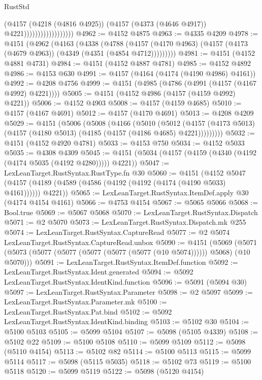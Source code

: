 \begin{lexlean}{RustStd}
\begin{coremodule}
                                    (@4157
                                      (@4218 (@4816 @4925))
                                      (@4157 (@4373 (@4646 @4917)) @4221))))))))))))))))))
@4962 := @4152 @4875
@4963 := @4335 @4209
@4978 := @4151
    (@4962
      (@4163
        (@4338
          (@4788
            (@4157 (@4170 @4963) (@4157 (@4173 (@4679 @4963)) (@4349 (@4351 (@4854 @4712)))))))))
@4981 := @4151 (@4152 @4881 @4731)
@4984 := @4151 (@4152 @4887 @4781)
@4985 := @4152 @4892
@4986 := @4153 @630
@4991 := @4157 (@4164 (@4174 (@4190 @4986) @4161))
@4992 := @4208 @4756
@4999 := @4151 (@4985 (@4786 (@4991 (@4157 (@4167 @4992) @4221))))
@5005 := @4151 (@4152 @4986 (@4157 (@4159 @4992) @4221))
@5006 := @4152 @4903
@5008 := @4157 (@4159 @4685)
@5010 := @4157 (@4167 @4691)
@5012 := @4157 (@4170 @4691)
@5013 := @4208 @4209
@5029 := @4151
    (@5006
      (@5008
        (@4166
          (@5010
            (@5012
              (@4157 (@4173 @5013) (@4157 (@4180 @5013) (@4185 (@4157 (@4186 @4685) @4221)))))))))
@5032 := @4151 (@4152 @4920 @4781)
@5033 := @4153 @750
@5034 := @4152 @5033
@5035 := @4308 @4309
@5045 := @4151 (@5034 (@4157 (@4159 (@4340 (@4192 (@4174 @5035 (@4192 @4280))))) @4221))
@5047 := LexLeanTarget.RustSyntax.RustType.fn @30
@5060 := @4151
    (@4152 @5047 (@4157 (@4189 (@4589 (@4586 (@4192 (@4192 (@4174 (@4190 @5033) @4161)))))) @4221))
@5065 := LexLeanTarget.RustSyntax.ItemDef.apply @30 (@4174 @4154 @4161)
@5066 := @4753 @4154
@5067 := @5065 @5066
@5068 := Bool.true
@5069 := @5067 @5068
@5070 := LexLeanTarget.RustSyntax.Dispatch
@5071 := @2 @5070
@5073 := LexLeanTarget.RustSyntax.Dispatch.mk @255
@5074 := LexLeanTarget.RustSyntax.CaptureRead
@5077 := @2 @5074 LexLeanTarget.RustSyntax.CaptureRead.unbox
@5090 := @4151
    (@5069 (@5071 (@5073 (@5077 (@5077 (@5077 (@5077 (@5077 (@10 @5074)))))) @5068) (@10 @5070)))
@5091 := LexLeanTarget.RustSyntax.ItemDef.function
@5092 := LexLeanTarget.RustSyntax.Ident.generated
@5094 := @5092 LexLeanTarget.RustSyntax.IdentKind.function
@5096 := @5091 (@5094 @30)
@5097 := LexLeanTarget.RustSyntax.Parameter
@5098 := @2 @5097
@5099 := LexLeanTarget.RustSyntax.Parameter.mk
@5100 := LexLeanTarget.RustSyntax.Pat.bind
@5102 := @5092 LexLeanTarget.RustSyntax.IdentKind.binding
@5103 := @5102 @30
@5104 := @5100 @5103
@5105 := @5099 @5104
@5107 := @5098 (@5105 @4339)
@5108 := @5102 @22
@5109 := @5100 @5108
@5110 := @5099 @5109
@5112 := @5098 (@5110 @4154)
@5113 := @5102 @82
@5114 := @5100 @5113
@5115 := @5099 @5114
@5117 := @5098 (@5115 @5035)
@5118 := @5102 @73
@5119 := @5100 @5118
@5120 := @5099 @5119
@5122 := @5098 (@5120 @4154)

\end{coremodule}
\end{lexlean}
